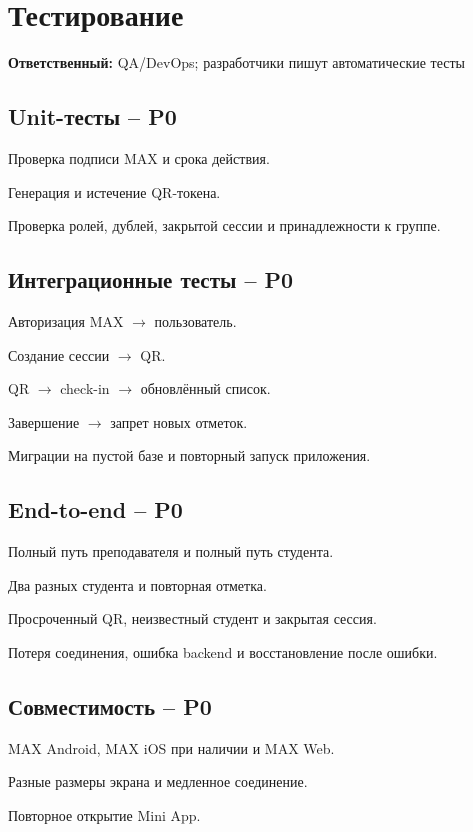 \documentclass[11pt,a4paper]{article}
\newcommand{\PZero}{\textcolor{PZero}{\textbf{P0}}}
\newcommand{\owner}[1]{\textcolor{Muted}{\textbf{Ответственный:} #1}}
\begin{document}
\section{Тестирование}
\owner{QA/DevOps; разработчики пишут автоматические тесты}

\subsection{Unit-тесты -- \PZero}
\begin{tasklist}
  \item Проверка подписи MAX и срока действия.
  \item Генерация и истечение QR-токена.
  \item Проверка ролей, дублей, закрытой сессии и принадлежности к группе.
\end{tasklist}

\subsection{Интеграционные тесты -- \PZero}
\begin{tasklist}
  \item Авторизация MAX $\rightarrow$ пользователь.
  \item Создание сессии $\rightarrow$ QR.
  \item QR $\rightarrow$ check-in $\rightarrow$ обновлённый список.
  \item Завершение $\rightarrow$ запрет новых отметок.
  \item Миграции на пустой базе и повторный запуск приложения.
\end{tasklist}

\subsection{End-to-end -- \PZero}
\begin{tasklist}
  \item Полный путь преподавателя и полный путь студента.
  \item Два разных студента и повторная отметка.
  \item Просроченный QR, неизвестный студент и закрытая сессия.
  \item Потеря соединения, ошибка backend и восстановление после ошибки.
\end{tasklist}

\subsection{Совместимость -- \PZero}
\begin{tasklist}
  \item MAX Android, MAX iOS при наличии и MAX Web.
  \item Разные размеры экрана и медленное соединение.
  \item Повторное открытие Mini App.
\end{tasklist}
\end{document}
